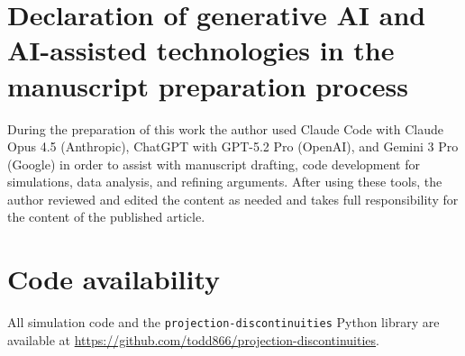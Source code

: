 \documentclass[12pt]{article}
\begin{document}
\section*{Declaration of generative AI and AI-assisted technologies in the manuscript preparation process}
During the preparation of this work the author used Claude Code with Claude Opus 4.5 (Anthropic), ChatGPT with GPT-5.2 Pro (OpenAI), and Gemini 3 Pro (Google) in order to assist with manuscript drafting, code development for simulations, data analysis, and refining arguments. After using these tools, the author reviewed and edited the content as needed and takes full responsibility for the content of the published article.

\section*{Code availability}
All simulation code and the \texttt{projection-discontinuities} Python library are available at \url{https://github.com/todd866/projection-discontinuities}.
\end{document}
